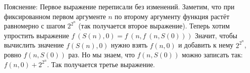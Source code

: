 \begin{enumerate}
Пояснение: Первое выражение переписали без изменений. Заметим, что при фиксированном первом аргументе $n$ по 
второму аргументу функция растёт равномерно с шагом $2^{2 ^ n}$ (так получается второе выражение). Теперь хотим 
упростить выражение $f \ (S(n), 0) = f \ (n, f \ (n, S(0)))$ Значит, чтобы вычислить значение $f(S(n), 0)$ нужно 
взять $f(n, 0)$ и добавить к нему $2^{2^n}$, ровно $f(n, S(0))$ раз. Но мы знаем, что $f(n, S(0))$ можно записать 
так: $f(n, 0) + 2^{2^n}$. Так получается третье выражение.

\end{enumerate}
